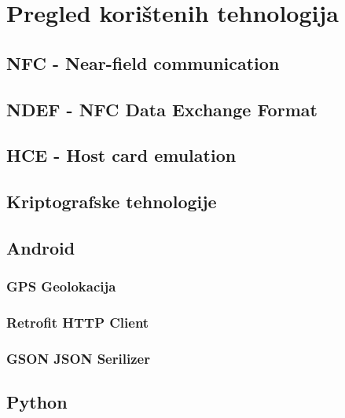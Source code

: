 \chapter{Pregled korištenih tehnologija}
\section{NFC - Near-field communication}
\section{NDEF - NFC Data Exchange Format}
\section{HCE - Host card emulation}
\section{Kriptografske tehnologije}
\section{Android}
\subsection{GPS Geolokacija}
\subsection{Retrofit HTTP Client}
\subsection{GSON JSON Serilizer}
\section{Python}